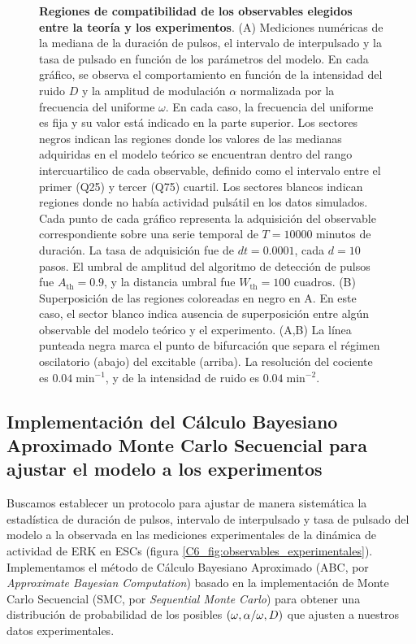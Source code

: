 \documentclass[./main.tex]{subfiles}
\begin{document}
\begin{figure}
    \caption{\textbf{Regiones de compatibilidad de los observables elegidos entre la teoría y los experimentos}. (A) Mediciones numéricas de la mediana de la duración de pulsos, el intervalo de interpulsado y la tasa de pulsado en función de los parámetros del modelo. En cada gráfico, se observa el comportamiento en función de la intensidad del ruido $D$ y la amplitud de modulación $\alpha$ normalizada por la frecuencia del uniforme $\omega$. En cada caso, la frecuencia del uniforme es fija y su valor está indicado en la parte superior. Los sectores negros indican las regiones donde los valores de las medianas adquiridas en el modelo teórico se encuentran dentro del rango intercuartilico de cada observable, definido como el intervalo entre el primer (Q25) y tercer (Q75) cuartil. Los sectores blancos indican regiones donde no había actividad pulsátil en los datos simulados. Cada punto de cada gráfico representa la adquisición del observable correspondiente sobre una serie temporal de $T = 10000$ minutos de duración. La tasa de adquisición fue de $dt = 0.0001$, cada $d = 10$ pasos. El umbral de amplitud del algoritmo de detección de pulsos fue $A_{\text{th}} = 0.9$, y la distancia umbral fue $W_{\text{th}} = 100\text{ cuadros}$. (B) Superposición de las regiones coloreadas en negro en A. En este caso, el sector blanco indica ausencia de superposición entre algún observable del modelo teórico y el experimento. (A,B) La línea punteada negra marca el punto de bifurcación que separa el régimen oscilatorio (abajo) del excitable (arriba). La resolución del cociente \dddelta es $0.04\; \text{min}^{-1}$, y de la intensidad de ruido es $0.04\; \text{min}^{-2}$.}
    \label{C6_fig:2d_plots_sup}
\end{figure}




\subsection{Implementación del Cálculo Bayesiano Aproximado Monte Carlo Secuencial para ajustar el modelo a los experimentos}
\label{C6_sssec:implementac_ABCSMC}

Buscamos establecer un protocolo para ajustar de manera sistemática la estadística de duración de pulsos, intervalo de interpulsado y tasa de pulsado del modelo a la observada en las mediciones experimentales de la dinámica de actividad de ERK en ESCs (figura \ref{C6_fig:observables_experimentales}). Implementamos el método de Cálculo Bayesiano Aproximado (ABC, por \textit{Approximate Bayesian Computation}) basado en la implementación de Monte Carlo Secuencial (SMC, por \textit{Sequential Monte Carlo}) para obtener una distribución de probabilidad de los posibles $(\omega,\alpha/\omega,D)$ que ajusten a nuestros datos experimentales.
\end{document}
